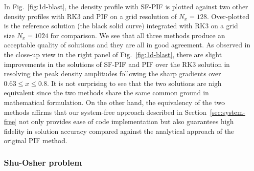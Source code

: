 \documentclass[times,preprint,3p]{elsarticle}
\begin{document}
In Fig.~\ref{fig:1d-blast}, the density profile with SF-PIF is plotted against two other density profiles
with RK3 and PIF on a grid resolution of  \( N_{x} = 128 \).
Over-plotted is the reference solution (the black solid curve)
integrated with RK3 on a grid size \( N_{x} = 1024 \) for comparison.
We see that all three methods produce an acceptable quality of solutions
and they are all in good agreement.
As observed in the close-up view in the right panel of Fig.~\ref{fig:1d-blast},
there are slight improvements in the solutions of SF-PIF and PIF over
the RK3 solution
in resolving the peak density amplitudes following the sharp gradients
over $0.63 \le x \le 0.8$.
It is not surprising to see that
the two solutions are nigh equivalent
since the two methods share the same common
ground in mathematical formulation.
On the other hand, the equivalency of the two methods affirms that
our system-free approach described in Section~\ref{sec:system-free}
not only provides ease of code implementation but also guarantees
high fidelity in solution accuracy compared against
the analytical approach of the original PIF method.



\subsubsection{Shu-Osher problem}
\end{document}
